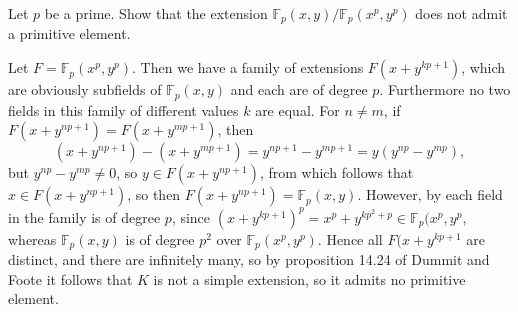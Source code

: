 \documentclass[a4paper, 11pt]{homework}
\newcommand{\F}{\mathbb{F}}
\begin{document}
\begin{questions}
	\question{} Let \(p\) be a prime. Show that the extension \(\F_p(x,y)/\F_p(x^p,y^p)\) does not admit a primitive
	element.
	\begin{solution}
		Let \(F = \F_p(x^p,y^p)\). Then we have a family of extensions \(F(x+y^{kp+1})\), which are obviously subfields
		of \(\F_p(x,y)\) and each are of degree \(p\). Furthermore no two fields in this family of different values
		\(k\) are equal. For \(n \ne m\), if \(F(x+y^{np+1}) = F(x+y^{mp+1})\), then
		\[(x+y^{np+1}) - (x + y^{mp+1}) = y^{np+1} - y^{mp+1} = y(y^{np} - y^{mp}),\]
		but \(y^{np} - y^{mp} \ne 0\), so \(y \in F(x+y^{np+1})\), from which follows that \(x \in F(x+y^{np+1})\), so
		then \(F(x+y^{np+1}) = \F_p(x,y)\). However, by each field in the family is of degree \(p\), since
		\((x+y^{kp+1})^p = x^p+y^{kp^2+p} \in \F_p(x^p,y^p\), whereas \(\F_p(x,y)\) is of degree \(p^2\) over
		\(\F_p(x^p, y^p)\). Hence all \(F(x+y^{kp+1}\) are distinct, and there are infinitely many, so by proposition
		14.24 of Dummit and Foote it follows that \(K\) is not a simple extension, so it admits no primitive element.
	\end{solution}
\end{questions}
\end{document}
